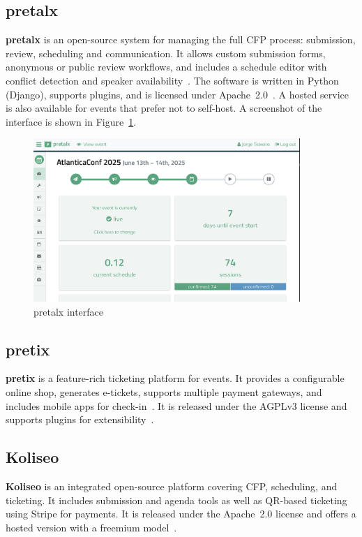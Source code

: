 \subsection*{pretalx}
\textbf{pretalx} is an open-source system for managing the full CFP process: submission, review, scheduling and communication. It allows custom submission forms, anonymous or public review workflows, and includes a schedule editor with conflict detection and speaker availability~\cite{pretalx-docs}. The software is written in Python (Django), supports plugins, and is licensed under Apache~2.0~\cite{pretalx-license}. A hosted service is also available for events that prefer not to self-host. A screenshot of the interface is shown in Figure~\ref{fig:pretalx-ui}.

\begin{figure}[H]
  \centering
  \includegraphics[width=0.9\textwidth]{imaxes/pretalx.com-ui.png}
  \caption{pretalx interface}
  \label{fig:pretalx-ui}
\end{figure}

\subsection*{pretix}
\textbf{pretix} is a feature-rich ticketing platform for events. It provides a configurable online shop, generates e-tickets, supports multiple payment gateways, and includes mobile apps for check-in~\cite{pretix-docs}. It is released under the AGPLv3 license and supports plugins for extensibility~\cite{pretix-license-faq}.

\subsection*{Koliseo}
\textbf{Koliseo} is an integrated open-source platform covering CFP, scheduling, and ticketing. It includes submission and agenda tools as well as QR-based ticketing using Stripe for payments. It is released under the Apache~2.0 license and offers a hosted version with a freemium model~\cite{koliseo-website}.

